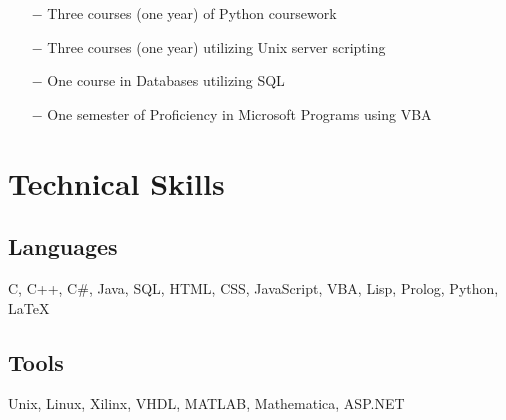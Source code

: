 \documentclass{article}
\begin{document}
\begin{itemize}
	\item[$-$] Three courses (one year) of Python coursework
	\item[$-$] Three courses (one year) utilizing Unix server scripting
	\item[$-$] One course in Databases utilizing SQL
	\item[$-$] One semester of Proficiency in Microsoft Programs using VBA
\end{itemize}

\section{Technical Skills}

\subsection{Languages}

C, C++, C\#, Java, SQL, HTML, CSS, JavaScript, VBA, Lisp, Prolog, Python, \LaTeX

\subsection{Tools}

Unix, Linux, Xilinx, VHDL, MATLAB, Mathematica, ASP.NET
\end{document}
